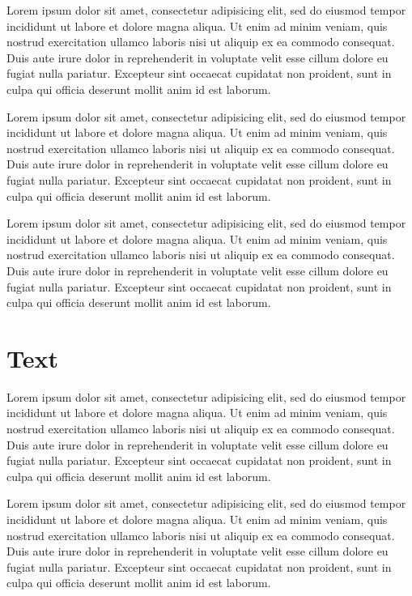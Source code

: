 \documentclass[10pt,a4paper,extrafontsizes,oldfontcommands,oneside]{memoir}
\begin{document}
\clearpage
Lorem ipsum dolor sit amet, consectetur adipisicing elit, sed do eiusmod tempor incididunt ut labore et dolore magna aliqua. Ut enim ad minim veniam, quis nostrud exercitation ullamco laboris nisi ut aliquip ex ea commodo consequat. Duis aute irure dolor in reprehenderit in voluptate velit esse cillum dolore eu fugiat nulla pariatur. Excepteur sint occaecat cupidatat non proident, sunt in culpa qui officia deserunt mollit anim id est laborum.

\clearpage
Lorem ipsum dolor sit amet, consectetur adipisicing elit, sed do eiusmod tempor incididunt ut labore et dolore magna aliqua. Ut enim ad minim veniam, quis nostrud exercitation ullamco laboris nisi ut aliquip ex ea commodo consequat. Duis aute irure dolor in reprehenderit in voluptate velit esse cillum dolore eu fugiat nulla pariatur. Excepteur sint occaecat cupidatat non proident, sunt in culpa qui officia deserunt mollit anim id est laborum.

\clearpage
Lorem ipsum dolor sit amet, consectetur adipisicing elit, sed do eiusmod tempor incididunt ut labore et dolore magna aliqua. Ut enim ad minim veniam, quis nostrud exercitation ullamco laboris nisi ut aliquip ex ea commodo consequat. Duis aute irure dolor in reprehenderit in voluptate velit esse cillum dolore eu fugiat nulla pariatur. Excepteur sint occaecat cupidatat non proident, sunt in culpa qui officia deserunt mollit anim id est laborum.


\section{Text} %
\label{sec:text}


Lorem ipsum dolor sit amet, consectetur adipisicing elit, sed do eiusmod tempor incididunt ut labore et dolore magna aliqua. Ut enim ad minim veniam, quis nostrud exercitation ullamco laboris nisi ut aliquip ex ea commodo consequat. Duis aute irure dolor in reprehenderit in voluptate velit esse cillum dolore eu fugiat nulla pariatur. Excepteur sint occaecat cupidatat non proident, sunt in culpa qui officia deserunt mollit anim id est laborum.


Lorem ipsum dolor sit amet, consectetur adipisicing elit, sed do eiusmod tempor incididunt ut labore et dolore magna aliqua. Ut enim ad minim veniam, quis nostrud exercitation ullamco laboris nisi ut aliquip ex ea commodo consequat. Duis aute irure dolor in reprehenderit in voluptate velit esse cillum dolore eu fugiat nulla pariatur. Excepteur sint occaecat cupidatat non proident, sunt in culpa qui officia deserunt mollit anim id est laborum.
\end{document}
